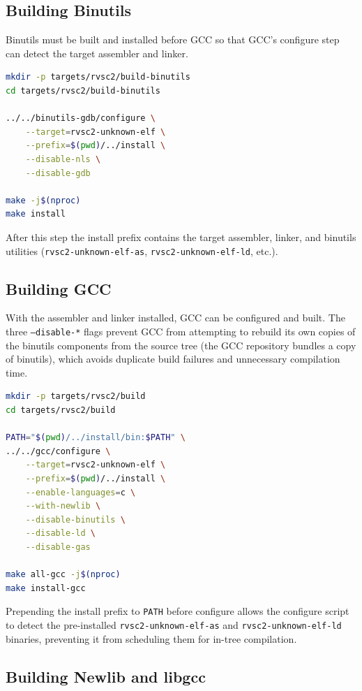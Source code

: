 \subsection{Building Binutils} \label{sec:building-binutils}

Binutils must be built and installed before GCC so that GCC's configure step can detect the target
assembler and linker.

\begin{lstlisting}[language=bash]
mkdir -p targets/rvsc2/build-binutils
cd targets/rvsc2/build-binutils

../../binutils-gdb/configure \
    --target=rvsc2-unknown-elf \
    --prefix=$(pwd)/../install \
    --disable-nls \
    --disable-gdb

make -j$(nproc)
make install
\end{lstlisting}

After this step the install prefix contains the target assembler, linker, and binutils utilities
(\texttt{rvsc2-unknown-elf-as}, \texttt{rvsc2-unknown-elf-ld}, etc.).

\subsection{Building GCC}

With the assembler and linker installed, GCC can be configured and built. The three
\texttt{--disable-*} flags prevent GCC from attempting to rebuild its own copies of the binutils
components from the source tree (the GCC repository bundles a copy of binutils), which avoids
duplicate build failures and unnecessary compilation time.

\begin{lstlisting}[language=bash]
mkdir -p targets/rvsc2/build
cd targets/rvsc2/build

PATH="$(pwd)/../install/bin:$PATH" \
../../gcc/configure \
    --target=rvsc2-unknown-elf \
    --prefix=$(pwd)/../install \
    --enable-languages=c \
    --with-newlib \
    --disable-binutils \
    --disable-ld \
    --disable-gas

make all-gcc -j$(nproc)
make install-gcc
\end{lstlisting}

Prepending the install prefix to \texttt{PATH} before configure allows the configure script to detect
the pre-installed \texttt{rvsc2-unknown-elf-as} and \texttt{rvsc2-unknown-elf-ld} binaries, preventing
it from scheduling them for in-tree compilation.

\subsection{Building Newlib and libgcc}

